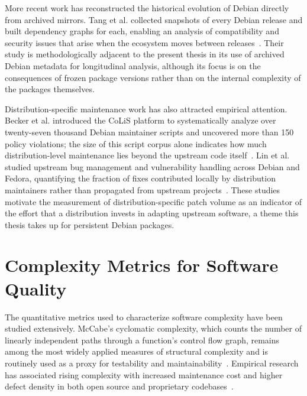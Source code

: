 More recent work has reconstructed the historical evolution of Debian directly from archived mirrors. Tang et al. collected snapshots of every Debian release and built dependency graphs for each, enabling an analysis of compatibility and security issues that arise when the ecosystem moves between releases~\cite{tang2024frozen}. Their study is methodologically adjacent to the present thesis in its use of archived Debian metadata for longitudinal analysis, although its focus is on the consequences of frozen package versions rather than on the internal complexity of the packages themselves.

Distribution-specific maintenance work has also attracted empirical attention. Becker et al. introduced the CoLiS platform to systematically analyze over twenty-seven thousand Debian maintainer scripts and uncovered more than 150 policy violations; the size of this script corpus alone indicates how much distribution-level maintenance lies beyond the upstream code itself~\cite{becker2022colis}. Lin et al. studied upstream bug management and vulnerability handling across Debian and Fedora, quantifying the fraction of fixes contributed locally by distribution maintainers rather than propagated from upstream projects~\cite{lin2022upstream,lin2023vulnerability}. These studies motivate the measurement of distribution-specific patch volume as an indicator of the effort that a distribution invests in adapting upstream software, a theme this thesis takes up for persistent Debian packages.

\section{Complexity Metrics for Software Quality}
\label{sec:rw_metrics}

The quantitative metrics used to characterize software complexity have been studied extensively. McCabe's cyclomatic complexity, which counts the number of linearly independent paths through a function's control flow graph, remains among the most widely applied measures of structural complexity and is routinely used as a proxy for testability and maintainability~\cite{CyclomaticComplexity}. Empirical research has associated rising complexity with increased maintenance cost and higher defect density in both open source and proprietary codebases~\cite{nguyen2017impact}.

